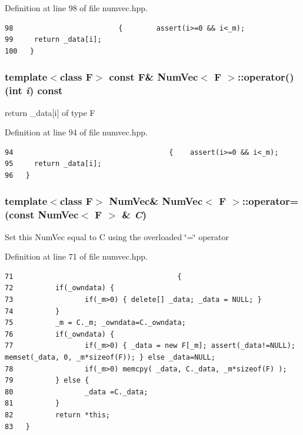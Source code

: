 Definition at line 98 of file numvec.hpp.

\footnotesize\begin{verbatim}98                         {        assert(i>=0 && i<_m);
99     return _data[i]; 
100   }
\end{verbatim}\normalsize 


\subsubsection{\setlength{\rightskip}{0pt plus 5cm}template$<$class F$>$ const F\& {\bf Num\-Vec}$<$ F $>$::operator() (int {\em i}) const\hspace{0.3cm}{\tt  [inline]}}\label{classNumVec_46442ed0ae535217a90cc5b4b63a1f44_46442ed0ae535217a90cc5b4b63a1f44}


return \_\-data[i] of type F 

Definition at line 94 of file numvec.hpp.

\footnotesize\begin{verbatim}94                                     {    assert(i>=0 && i<_m);
95     return _data[i]; 
96   }
\end{verbatim}\normalsize 


\subsubsection{\setlength{\rightskip}{0pt plus 5cm}template$<$class F$>$ {\bf Num\-Vec}\& {\bf Num\-Vec}$<$ F $>$::operator= (const {\bf Num\-Vec}$<$ F $>$ \& {\em C})\hspace{0.3cm}{\tt  [inline]}}\label{classNumVec_0c365a5c16a3b38d62f77787f2724617_0c365a5c16a3b38d62f77787f2724617}


Set this Num\-Vec equal to C using the overloaded \char`\"{}=\char`\"{} operator 

Definition at line 71 of file numvec.hpp.

\footnotesize\begin{verbatim}71                                       {
72          if(_owndata) { 
73                 if(_m>0) { delete[] _data; _data = NULL; }
74          }
75          _m = C._m; _owndata=C._owndata;
76          if(_owndata) {
77                 if(_m>0) { _data = new F[_m]; assert(_data!=NULL); memset(_data, 0, _m*sizeof(F)); } else _data=NULL;
78                 if(_m>0) memcpy( _data, C._data, _m*sizeof(F) );
79          } else {
80                 _data =C._data;
81          }
82          return *this;
83   }
\end{verbatim}\normalsize 


